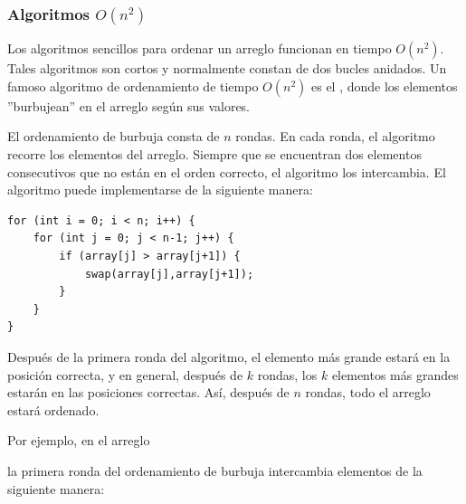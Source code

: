 \subsubsection{Algoritmos $O(n^2)$}


Los algoritmos sencillos para ordenar un arreglo
funcionan en tiempo $O(n^2)$.
Tales algoritmos son cortos y normalmente
constan de dos bucles anidados.
Un famoso algoritmo de ordenamiento de tiempo $O(n^2)$
es el , donde los elementos
''burbujean'' en el arreglo según sus valores.

El ordenamiento de burbuja consta de $n$ rondas.
En cada ronda, el algoritmo recorre
los elementos del arreglo.
Siempre que se encuentran dos elementos consecutivos
que no están en el orden correcto,
el algoritmo los intercambia.
El algoritmo puede implementarse de la siguiente manera:
\begin{lstlisting}
for (int i = 0; i < n; i++) {
    for (int j = 0; j < n-1; j++) {
        if (array[j] > array[j+1]) {
            swap(array[j],array[j+1]);
        }
    }
}
\end{lstlisting}

Después de la primera ronda del algoritmo,
el elemento más grande estará en la posición correcta,
y en general, después de $k$ rondas, los $k$ elementos
más grandes estarán en las posiciones correctas.
Así, después de $n$ rondas, todo el arreglo
estará ordenado.

Por ejemplo, en el arreglo

\begin{center}
\end{center}

\noindent
la primera ronda del ordenamiento de burbuja intercambia elementos
de la siguiente manera:

\begin{center}
\end{center}

